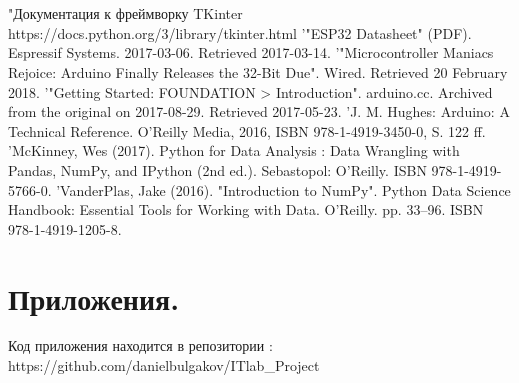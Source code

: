 \documentclass[a4document]{article}
\begin{document}
{


\section*{} 
\newpage
\begin{thebibliography}{7}
\bibitem  "Документация к фреймворку TKinter https://docs.python.org/3/library/tkinter.html
\bibitem '"ESP32 Datasheet" (PDF). Espressif Systems. 2017-03-06. Retrieved 2017-03-14.
\bibitem '"Microcontroller Maniacs Rejoice: Arduino Finally Releases the 32-Bit Due". Wired. Retrieved 20 February 2018.
\bibitem '"Getting Started: FOUNDATION > Introduction". arduino.cc. Archived from the original on 2017-08-29. Retrieved 2017-05-23.
\bibitem 'J. M. Hughes: Arduino: A Technical Reference. O'Reilly Media, 2016, ISBN 978-1-4919-3450-0, S. 122 ff.
\bibitem 'McKinney, Wes (2017). Python for Data Analysis : Data Wrangling with Pandas, NumPy, and IPython (2nd ed.). Sebastopol: O'Reilly. ISBN 978-1-4919-5766-0.
\bibitem 'VanderPlas, Jake (2016). "Introduction to NumPy". Python Data Science Handbook: Essential Tools for Working with Data. O'Reilly. pp. 33–96. ISBN 978-1-4919-1205-8.
\end{thebibliography}

}

{
\newpage

\section*{Приложения.} 
Код приложения находится в репозитории : 
\\ https://github.com/danielbulgakov/ITlab\_Project
}
\end{document}
